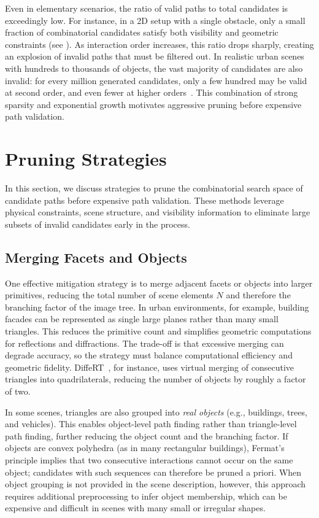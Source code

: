 Even in elementary scenarios, the ratio of valid paths to total candidates is exceedingly low. For instance, in a 2D setup with a single obstacle, only a small fraction of combinatorial candidates satisfy both visibility and geometric constraints (see ). As interaction order increases, this ratio drops sharply, creating an explosion of invalid paths that must be filtered out. In realistic urban scenes with hundreds to thousands of objects, the vast majority of candidates are also invalid: for every million generated candidates, only a few hundred may be valid at second order, and even fewer at higher orders~. This combination of strong sparsity and exponential growth motivates aggressive pruning before expensive path validation.

\section{Pruning Strategies}

In this section, we discuss strategies to prune the combinatorial search space of candidate paths before expensive path validation. These methods leverage physical constraints, scene structure, and visibility information to eliminate large subsets of invalid candidates early in the process.

\subsection{Merging Facets and Objects}

One effective mitigation strategy is to merge adjacent facets or objects into larger primitives, reducing the total number of scene elements $N$ and therefore the branching factor of the image tree. In urban environments, for example, building facades can be represented as single large planes rather than many small triangles. This reduces the primitive count and simplifies geometric computations for reflections and diffractions. The trade-off is that excessive merging can degrade accuracy, so the strategy must balance computational efficiency and geometric fidelity. DiffeRT~, for instance, uses virtual merging of consecutive triangles into quadrilaterals, reducing the number of objects by roughly a factor of two.

In some scenes, triangles are also grouped into \emph{real objects} (e.g., buildings, trees, and vehicles). This enables object-level path finding rather than triangle-level path finding, further reducing the object count and the branching factor. If objects are convex polyhedra (as in many rectangular buildings), Fermat's principle implies that two consecutive interactions cannot occur on the same object; candidates with such sequences can therefore be pruned a priori. When object grouping is not provided in the scene description, however, this approach requires additional preprocessing to infer object membership, which can be expensive and difficult in scenes with many small or irregular shapes.

